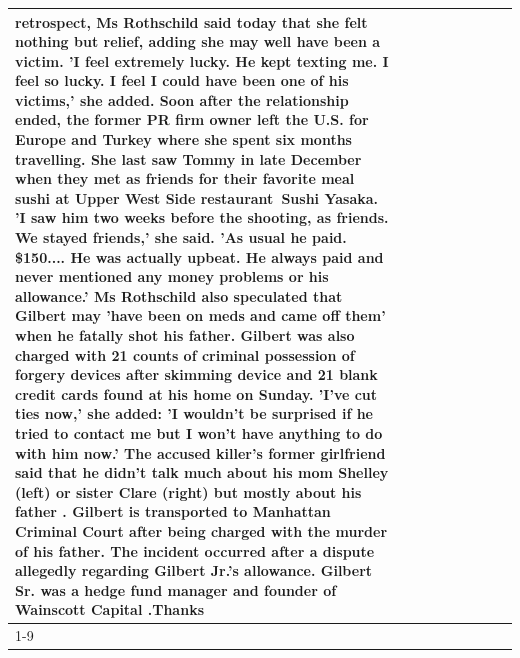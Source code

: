 \begin{table}[H]
\begin{tabular}{lllrlllll}
retrospect, Ms Rothschild said today that she felt nothing but relief, adding she may well have been a victim. 'I feel extremely lucky. He kept texting me. I feel so lucky. I feel I could have been one of his victims,' she added. Soon after the relationship ended, the former PR firm owner left the U.S. for Europe and Turkey where she spent six months  travelling. She last saw Tommy in late December when they met as friends for their favorite meal sushi at Upper West Side restaurant Sushi Yasaka. 'I saw him two weeks before the shooting, as friends. We stayed friends,' she said. 'As usual he paid. \$150.... He was actually upbeat. He always paid and never mentioned any money problems or his allowance.' Ms Rothschild also speculated that Gilbert may 'have been on meds and came off them' when he fatally shot his father. Gilbert was also charged with 21 counts of criminal possession of forgery devices after skimming device and 21 blank credit cards found at his home on Sunday. 'I've cut ties now,' she added: 'I wouldn’t be surprised if he tried to contact me but I won’t have anything to do with him now.' The accused killer's former girlfriend said that he didn't talk much about his mom Shelley (left) or sister Clare (right) but mostly about his father . Gilbert is transported to Manhattan Criminal Court  after being charged with the murder of his father. The incident occurred after a dispute allegedly regarding Gilbert Jr.'s allowance. Gilbert Sr. was a hedge fund manager and founder of Wainscott Capital .Thanks \\
\cline{1-9} \cline{2-9}

\end{tabular}
\end{table}
